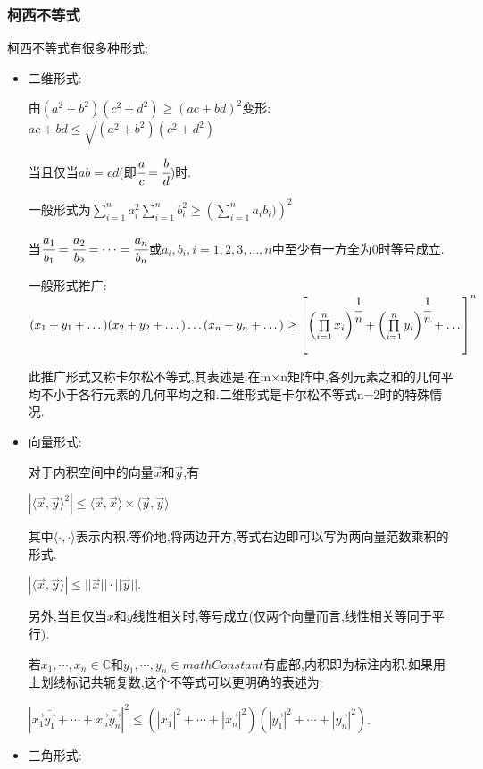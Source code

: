 \documentclass[UTF8,12pt]{ctexbook}
\newcommand{\upDownSum}[2]{\sum\limits_{#2}^{#1}}
\newcommand{\upDownProd}[2]{\prod\limits_{#2}^{#1}}
\newcommand{\mathConstant}{\mathbb{C}}
\newcommand{\bigCase}[1]{\left(#1\right)}
\newcommand{\innerProduct}[2]{\langle#1,#2\rangle}
\begin{document}
{{{\subsubsection{柯西不等式}{
  柯西不等式有很多种形式:
  \begin{itemize}
    \item {
          二维形式:

          由$(a^2 + b^2)(c^2 + d^2)\geq(ac + bd)^2$变形:$ac + bd \leq \sqrt{(a^2 + b^2)(c^2 + d^2)}$

          当且仅当$ab = cd$(即$\cfrac{a}{c} = \cfrac{b}{d}$)时.

          一般形式为$\upDownSum{n}{i = 1}a_i^2\upDownSum{n}{i = 1}b_i^2\geq\bigCase{\upDownSum{n}{i = 1}a_ib_i)}^2$

          当$\cfrac{a_1}{b_1} = \cfrac{a_2}{b_2} = \dots = \cfrac{a_n}{b_n}$或$a_i,b_i,i = 1,2,3,\dots,n$中至少有一方全为$0$时等号成立.

          一般形式推广:$(x_1 + y_1 + \dots)(x_2 + y_2 + \dots)\dots(x_n + y_n + \dots) \geq \left[\bigCase{\upDownProd{n}{i = 1}x_i}^{\cfrac{1}{n}} + \bigCase{\upDownProd{n}{i = 1}y_i}^{\cfrac{1}{n}} + \dots\right]^n$

          此推广形式又称卡尔松不等式,其表述是:在m×n矩阵中,各列元素之和的几何平均不小于各行元素的几何平均之和.二维形式是卡尔松不等式n=2时的特殊情况.
          }
    \item {
          向量形式:

          对于内积空间中的向量$\vec{x}$和$\vec{y}$,有

          $|\innerProduct{\vec{x}}{\vec{y}}^2| \leq \innerProduct{\vec{x}}{\vec{x}} \times \innerProduct{\vec{y}}{\vec{y}}$

          其中$\innerProduct{\cdot}{\cdot}$表示内积.等价地,将两边开方,等式右边即可以写为两向量范数乘积的形式.

          $|\innerProduct{\vec{x}}{\vec{y}}| \leq ||\vec{x}||\cdot||\vec{y}||$.

          另外,当且仅当$x$和$y$线性相关时,等号成立(仅两个向量而言,线性相关等同于平行).

          若$x_1,\dotsm,x_n \in \mathConstant$和$y_1,\dotsm,y_n \in mathConstant$有虚部,内积即为标注内积.如果用上划线标记共轭复数,这个不等式可以更明确的表述为:

          $|\vec{x_1}\bar{\vec{y_1}} + \dotsm + \vec{x_n}\bar{\vec{y_n}}|^2\leq (|\vec{x_1}|^2 + \dotsm + |\vec{x_n}|^2)(|\vec{y_1}|^2 + \dotsm + |\vec{y_n}|^2)$.
          }
    \item {
          三角形式:

}
\end{itemize}}}}}
\end{document}
